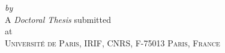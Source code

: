 
\begin{titlepage}
  \vspace*{5cm}
  \makeatletter
  \begin{center}
    \begin{Huge}
      \@title
    \end{Huge}\\[0.1cm]
    \begin{Large}
      \@subtitle
    \end{Large}\\
    \emph{by}\\
    \@author
    \vfill
    A \emph{Doctoral Thesis} submitted\\
    at\\
    \textsc{Université de Paris, IRIF, CNRS, F-75013 Paris, France}
  \end{center}
  \makeatother
\end{titlepage}

\newpage
\null
\thispagestyle{empty}
\newpage
